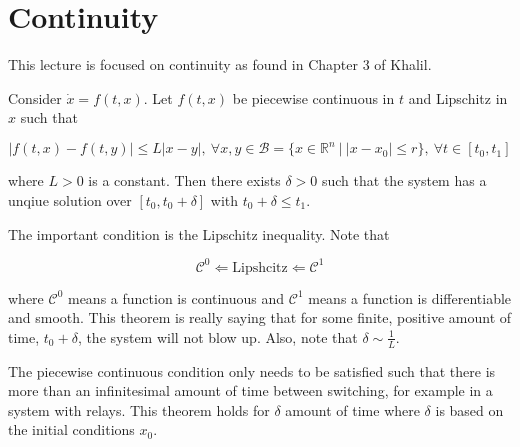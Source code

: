 \mainmatter%
\setcounter{page}{1}

\lectureseries[\course]{\course}

\date{January 19, 2010}

\setaddress%

\setcounter{lecture}{4}
\setcounter{chapter}{4}


\section{Continuity}
This lecture is focused on continuity as found in Chapter 3 of Khalil.

\begin{theorem}%
\label{th:05lip}
Consider $\dot{x} = f(t,x)$.
Let $f(t,x)$ be piecewise continuous in $t$ and Lipschitz in $x$ such that

\begin{equation*}
|f(t,x) - f(t,y)| \leq L|x-y|,~\forall x,y\in\mathcal{B} = \{x\in\mathbb{R}^n~|~|x-x_0|\leq r\},~\forall t\in[t_0,t_1]
\end{equation*}

where $L>0$ is a constant.
Then there exists $\delta>0$ such that the system has a unqiue solution over $[t_0,t_0+\delta]$ with $t_0+\delta\leq t_1$.
\end{theorem}

The important condition is the Lipschitz inequality.
Note that

\begin{equation*}
\mathcal{C}^0 \Leftarrow \text{Lipshcitz} \Leftarrow \mathcal{C}^1
\end{equation*}

where $\mathcal{C}^0$ means a function is continuous and $\mathcal{C}^1$ means a function is differentiable and smooth.
This theorem is really saying that for some finite, positive amount of time, $t_0+\delta$, the system will not blow up.
Also, note that $\delta\sim\frac{1}{L}$.

The piecewise continuous condition only needs to be satisfied such that there is more than an infinitesimal amount of time between switching, for example in a system with relays.
This theorem holds for $\delta$ amount of time where $\delta$ is based on the initial conditions $x_0$.


